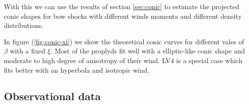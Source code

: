 With this we can use the results of section \ref{sec:conic} to estimate the projected conic shapes for bow shocks with different winds 
momenta and different density distributions. 

In figure (\ref{fig:conic-xi}) we show the theoretical conic curves for different vales of $\beta$ with a fixed $\xi$. Most of the proplyds fit well 
with a elliptic-like conic shape and moderate to high degree of anisotropy of their wind.
LV4 is a special case which fits better with an hyperbola and isotropic wind.



 
\subsection{Observational data}


